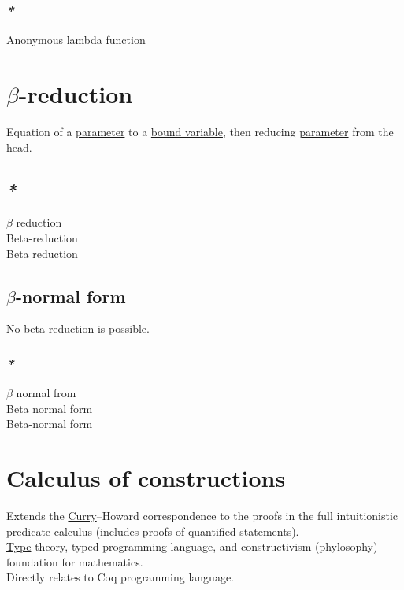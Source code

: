 \documentclass[a4paper,14pt,oneside]{book}
\begin{document}
\subsubsection{\emph{*}}
\label{sec:orgb3685c2}

\label{org2b1170e}Anonymous lambda function\\

\section{\label{org65402d6}\(\beta\)-reduction}
\label{sec:orge1da3b0}
Equation of a \hyperref[org63b5bc7]{parameter} to a \hyperref[orgbf6bfdd]{bound variable}, then reducing \hyperref[org63b5bc7]{parameter} from the head.\\

\subsection{\emph{*}}
\label{sec:orgb337333}

\label{org0978d7c}\(\beta\) reduction\\
\label{org42a1fe3}Beta-reduction\\
\label{orgad71228}Beta reduction\\

\subsection{\label{org69eb670}\(\beta\)-normal form}
\label{sec:org99d528d}
No \hyperref[orgad71228]{beta reduction} is possible.\\

\subsubsection{\emph{*}}
\label{sec:org6284451}

\label{orgaf7f0e6}\(\beta\) normal from\\
\label{org6480cdd}Beta normal form\\
\label{org60d02cf}Beta-normal form\\

\section{\label{orgc61b184}Calculus of constructions}
\label{sec:org7504695}
Extends the \hyperref[orga26927b]{Curry}–Howard correspondence to the proofs in the full intuitionistic \hyperref[org87e8b2f]{predicate} calculus (includes proofs of \hyperref[org86b6a8e]{quantified} \hyperref[org317a579]{statements}).\\
\hyperref[orgc4a7610]{Type} theory, typed programming language, and constructivism (phylosophy) foundation for mathematics.\\
Directly relates to Coq programming language.\\
\end{document}
